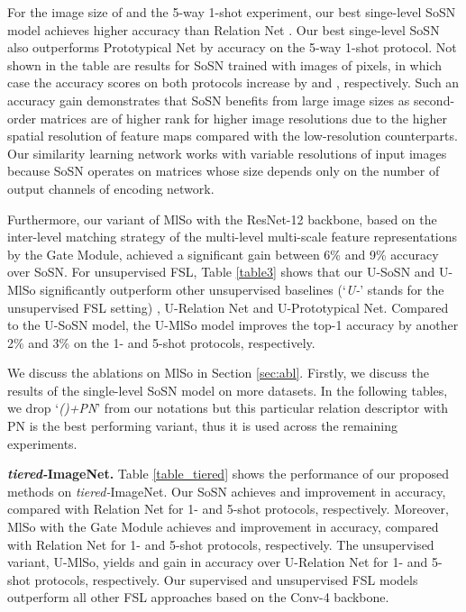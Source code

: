 For the image size of  and the 5-way 1-shot experiment, our best singe-level SoSN model achieves  higher accuracy than Relation Net \cite{sung2017learning}. Our best singe-level SoSN also outperforms Prototypical Net by  accuracy on the 5-way 1-shot protocol. Not shown in the table are results for SoSN trained with images of  pixels, in which case the accuracy scores on both protocols increase by  and , respectively. Such an accuracy gain demonstrates that SoSN benefits from large image sizes as second-order matrices are of higher rank for higher image resolutions due to the higher spatial resolution of feature maps compared with the low-resolution counterparts. Our similarity learning network works with variable resolutions of input images because SoSN operates on matrices whose size depends only on the number of output channels of encoding network.  

{Furthermore, our variant of MlSo with the ResNet-12 backbone, based on the inter-level matching strategy of the multi-level multi-scale feature representations by the Gate Module, achieved a significant gain between 6\% and 9\% accuracy over SoSN.} 
For unsupervised FSL, Table \ref{table3} shows that our U-SoSN and U-MlSo significantly outperform other unsupervised baselines (`{\em U-}' stands for the unsupervised FSL setting) \eg, U-Relation Net and U-Prototypical Net. { Compared to the U-SoSN model, the U-MlSo model  improves the top-1 accuracy by another 2\% and 3\% on the 1- and 5-shot protocols, respectively. }

{We  discuss the ablations on MlSo in Section \ref{sec:abl}. Firstly, we  discuss the results of the single-level SoSN model on more datasets. In the following tables, we drop `{\em ()+PN}' from our notations but this particular relation descriptor with PN is the best performing variant, thus it is used across the remaining experiments.}

\vspace{0.05cm}
\noindent\textbf{{\em tiered-}ImageNet.} Table \ref{table_tiered} shows the performance of our proposed methods on {\em tiered-}ImageNet. Our SoSN achieves  and  improvement in accuracy, compared with Relation Net for 1- and 5-shot protocols, respectively. { Moreover, MlSo with the Gate Module achieves  and  improvement in accuracy, compared with Relation Net for 1- and 5-shot protocols, respectively. The unsupervised variant, U-MlSo, yields  and  gain in accuracy over U-Relation Net for  1- and 5-shot protocols, respectively.
Our supervised and unsupervised FSL models outperform all other  FSL approaches based on the Conv-4 backbone.}

